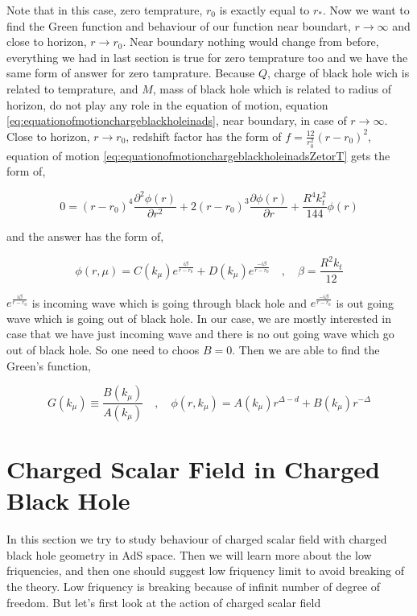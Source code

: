 Note that in this case, zero temprature, $r_0$ is exactly equal to $r_*$. Now we want to find the Green function and behaviour of our function near boundart, $r \rightarrow \infty$ and close to horizon, $r \rightarrow r_0$. Near boundary nothing would change from before, everything we had in last section is true for zero temprature too and we have the same form of answer for zero tamprature. Because $Q$, charge of black hole wich is related to temprature, and $M$, mass of black hole which is related to radius of horizon, do not play any role in the equation of motion, equation \ref{eq:equationofmotionchargeblackholeinads}, near boundary, in case of $r \rightarrow \infty$. Close to horizon, $r \rightarrow r_0$, redshift factor has the form of $f = \frac{12}{r^2_0}(r-r_0)^2$, equation of motion \ref{eq:equationofmotionchargeblackholeinadsZetorT} gets the form of,

\begin{equation}
    0 = (r-r_0)^4\frac{\partial^2\phi(r)}{\partial r^2} + 2(r-r_0)^3\frac{\partial\phi(r)}{\partial r} + \frac{R^4k^2_t}{144}\phi(r)
\end{equation}

and the answer has the form of,

\begin{equation}
    \phi(r,\mu) = C(k_\mu) e^{\frac{i\beta}{r-r_0}} + D(k_\mu) e^{\frac{-i\beta}{r-r_0}} \quad , \quad \beta = \frac{R^2k_t}{12}
\end{equation}

$e^{\frac{i\beta}{r-r_0}}$ is incoming wave which is going through black hole and $e^{\frac{-i\beta}{r-r_0}}$ is out going wave which is going out of black hole. In our case, we are mostly interested in case that we have just incoming wave and there is no out going wave which go out of black hole. So one need to choos $B = 0$. Then we are able to find the Green's function,

\begin{equation}
   G(k_\mu) \equiv \frac{B(k_\mu)}{A(k_\mu)} \quad , \quad \phi(r,k_\mu) = A(k_\mu)r^{\Delta-d} + B(k_\mu)r^{-\Delta}  
\end{equation} 

\section{Charged Scalar Field in Charged Black Hole}

In this section we try to study behaviour of charged scalar field with charged black hole geometry in AdS space. Then we will learn more about the low friquencies, and then one should suggest low friquency limit to avoid breaking of the theory. Low friquency is breaking because of infinit number of degree of freedom. But let's first look at the action of charged scalar field

